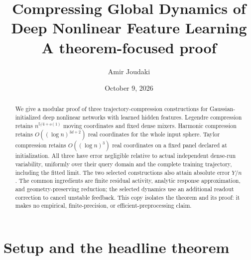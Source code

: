 \documentclass[11pt]{article}
\title{Compressing Global Dynamics of Deep Nonlinear Feature Learning\\
  \large A theorem-focused proof}
\author{Amir Joudaki}
\date{October 9, 2026}
\theoremstyle{definition}
\theoremstyle{remark}
\begin{document}
\maketitle
\begin{abstract}
We give a modular proof of three trajectory-compression constructions for
Gaussian-initialized deep nonlinear networks with learned hidden features.
Legendre compression retains $n^{5/4+o(1)}$ moving coordinates and fixed dense
mixers. Harmonic compression retains $O((\log n)^{3d+2})$ real coordinates
for the whole input sphere. Taylor compression retains
$O((\log n)^3)$ real coordinates on a fixed panel declared at initialization.
All three have error negligible relative to actual independent dense-run
variability, uniformly over their query domain and the complete training
trajectory, including the fitted limit. The two selected constructions also
attain absolute error $Y/n$. The common ingredients are finite residual
activity, analytic response approximation, and geometry-preserving reduction;
the selected dynamics use an additional readout correction to cancel unstable
feedback. This copy isolates the theorem and its proof: it makes no empirical,
finite-precision, or efficient-preprocessing claim.
\end{abstract}

\section{Setup and the headline theorem}
\label{cp:setup}
\end{document}
